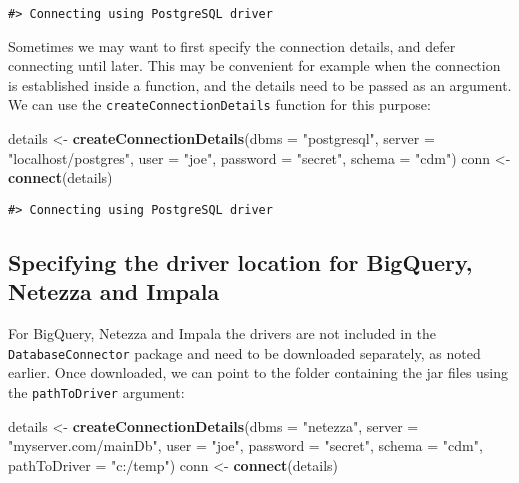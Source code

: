 \documentclass[]{article}
\newenvironment{Shaded}{\begin{snugshade}}{\end{snugshade}}
\newcommand{\DataTypeTok}[1]{\textcolor[rgb]{0.13,0.29,0.53}{#1}}
\newcommand{\KeywordTok}[1]{\textcolor[rgb]{0.13,0.29,0.53}{\textbf{#1}}}
\newcommand{\NormalTok}[1]{#1}
\newcommand{\StringTok}[1]{\textcolor[rgb]{0.31,0.60,0.02}{#1}}
\begin{document}
\begin{verbatim}
#> Connecting using PostgreSQL driver
\end{verbatim}

Sometimes we may want to first specify the connection details, and defer
connecting until later. This may be convenient for example when the
connection is established inside a function, and the details need to be
passed as an argument. We can use the \texttt{createConnectionDetails}
function for this purpose:

\begin{Shaded}
\begin{Highlighting}[]
\NormalTok{details <-}\StringTok{ }\KeywordTok{createConnectionDetails}\NormalTok{(}\DataTypeTok{dbms =} \StringTok{"postgresql"}\NormalTok{,}
                                   \DataTypeTok{server =} \StringTok{"localhost/postgres"}\NormalTok{,}
                                   \DataTypeTok{user =} \StringTok{"joe"}\NormalTok{,}
                                   \DataTypeTok{password =} \StringTok{"secret"}\NormalTok{,}
                                   \DataTypeTok{schema =} \StringTok{"cdm"}\NormalTok{)}
\NormalTok{conn <-}\StringTok{ }\KeywordTok{connect}\NormalTok{(details)}
\end{Highlighting}
\end{Shaded}

\begin{verbatim}
#> Connecting using PostgreSQL driver
\end{verbatim}

\hypertarget{specifying-the-driver-location-for-bigquery-netezza-and-impala}{%
\subsection{Specifying the driver location for BigQuery, Netezza and
Impala}\label{specifying-the-driver-location-for-bigquery-netezza-and-impala}}

For BigQuery, Netezza and Impala the drivers are not included in the
\texttt{DatabaseConnector} package and need to be downloaded separately,
as noted earlier. Once downloaded, we can point to the folder containing
the jar files using the \texttt{pathToDriver} argument:

\begin{Shaded}
\begin{Highlighting}[]
\NormalTok{details <-}\StringTok{ }\KeywordTok{createConnectionDetails}\NormalTok{(}\DataTypeTok{dbms =} \StringTok{"netezza"}\NormalTok{,}
                                   \DataTypeTok{server =} \StringTok{"myserver.com/mainDb"}\NormalTok{,}
                                   \DataTypeTok{user =} \StringTok{"joe"}\NormalTok{,}
                                   \DataTypeTok{password =} \StringTok{"secret"}\NormalTok{,}
                                   \DataTypeTok{schema =} \StringTok{"cdm"}\NormalTok{,}
                                   \DataTypeTok{pathToDriver =} \StringTok{"c:/temp"}\NormalTok{)}
\NormalTok{conn <-}\StringTok{ }\KeywordTok{connect}\NormalTok{(details)}
\end{Highlighting}
\end{Shaded}
\end{document}
